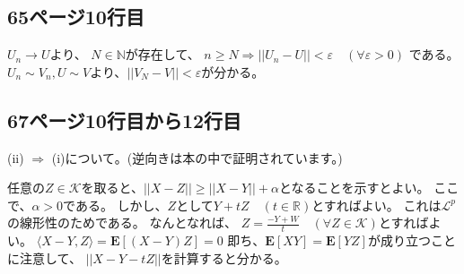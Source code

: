 \documentclass[11pt, a4paper]{jsarticle}
\theoremstyle{definition}
\newcommand{\NN}{{\mathbb{N}}} %
\newcommand{\RR}{{\mathbb{R}}} %
\begin{document}
  \subsection{65ページ10行目}
    $U_n \to U$より、
    $N \in \NN$が存在して、
    $n \ge N \Rightarrow ||U_n - U|| < \varepsilon \quad (\forall \varepsilon > 0)$
    である。
    $U_n \sim V_n, U \sim V$より、$||V_N - V|| < \varepsilon$が分かる。

  \subsection{67ページ10行目から12行目}
    (ii) $\Rightarrow$ (i)について。(逆向きは本の中で証明されています。)

    任意の$Z \in \mathcal{K}$を取ると、$||X - Z|| \ge ||X - Y|| + \alpha$となることを示すとよい。
    ここで、$\alpha > 0$である。
    しかし、$Z$として$Y + tZ \quad (t \in \RR)$とすればよい。
    これは$\mathcal{L}^p$の線形性のためである。
    なんとなれば、
    $Z = \frac{-Y+ W}{t} \quad (\forall Z \in \mathcal{K})$とすればよい。
    $\langle X - Y, Z \rangle = \mathbf{E}[(X - Y)Z] = 0$
    即ち、$\mathbf{E}[XY] = \mathbf{E}[YZ]$が成り立つことに注意して、
    $||X - Y - tZ||$を計算すると分かる。
\end{document}
